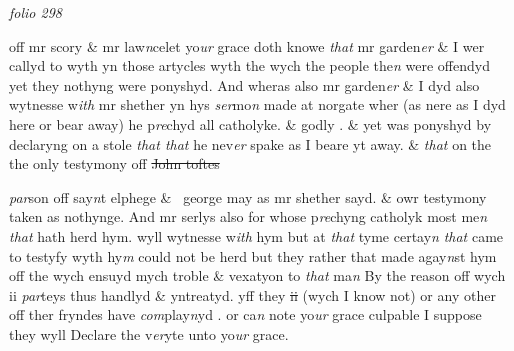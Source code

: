 \documentclass[12pt, a4paper]{book}
\begin{document}
\dotfill
						\newpage
{}

\textit{folio 298}


 	
		\ifthenelse{\isodd{\thepage}}
		{\reversemarginpar}
		{\normalmarginpar}
		off mr scory \& mr law\textit{n}celet yo\textit{ur} grace doth knowe \textit{that} mr garden\textit{er} \& I wer callyd to wyth
yn those artycles wyth the wych the people the\textit{n} were offendyd yet they nothyng were
ponyshyd. And wheras also mr garden\textit{er} \& I dyd also wytnesse w\textit{ith} mr shether yn hys
\textit{ser}mo\textit{n }made at norgate wher (as nere as I dyd here or bear away) he p\textit{re}chyd all
catholyke. \& godly . \& yet was ponyshyd by declaryng on a stole \textit{that that} he nev\textit{er} spake
as I beare yt away. \& \textit{that} on the the only testymony off \sout{John toftes}
               \textit{}
               
                  \textit{par}son off say\textit{n}t elphege
			 \&  george may
as mr shether sayd. \& owr testymony taken as nothynge. And mr serlys also
for whose p\textit{re}chyng catholyk most me\textit{n}
               \textit{that} hath herd hym. wyll wytnesse w\textit{ith} hym
but at \textit{that} tyme certay\textit{n}
               \textit{that} came to testyfy wyth hy\textit{m} could not be herd but they rather
that made agay\textit{n}st hym off the wych ensuyd mych troble \& vexatyon to \textit{that} ma\textit{n}
By the reason off wych ii \textit{par}teys thus handlyd \& yntreatyd. yff they \sout{ii }(wych I
know not) or any other off ther fryndes have \textit{com}play\textit{n}yd . or ca\textit{n} note yo\textit{ur} grace culpable
I suppose they wyll Declare the v\textit{er}yte unto yo\textit{ur} grace. 

 	
				\marginpar[\vspace{0.5cm}{\textcolor{Gray}{7.8.9.}}]{}
			 
\end{document}
